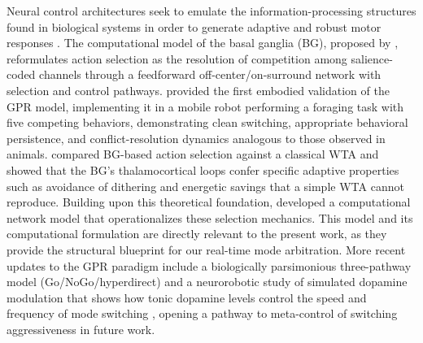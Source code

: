 Neural control architectures seek to emulate the information-processing structures found in biological systems in order to generate adaptive and robust motor responses \citep{mead1990neuromorphic,ijspeert2008}. The  computational model of the basal ganglia (BG), proposed by \citet{Gurney2001a,Gurney2001b}, reformulates action selection as the resolution of competition among salience-coded channels through a feedforward off-center/on-surround network with selection and control pathways. \citet{Prescott2006Robot} provided the first embodied validation of the GPR model, implementing it in a mobile robot performing a foraging task with five competing behaviors, demonstrating clean switching, appropriate behavioral persistence, and conflict-resolution dynamics analogous to those observed in animals. \citet{Girard2003Basal} compared BG-based action selection against a classical WTA and showed that the BG's thalamocortical loops confer specific adaptive properties such as avoidance of dithering and energetic savings that a simple WTA cannot reproduce. Building upon this theoretical foundation, \citet{sarvestani2013computational} developed a computational network model that operationalizes these selection mechanics. This model and its computational formulation are directly relevant to the present work, as they provide the structural blueprint for our real-time mode arbitration. More recent updates to the GPR paradigm include a biologically parsimonious three-pathway model (Go/NoGo/hyperdirect) \citep{Baston2015Biologically} and a neurorobotic study of simulated dopamine modulation that shows how tonic dopamine levels control the speed and frequency of mode switching \citep{Prescott2024Simulated}, opening a pathway to meta-control of switching aggressiveness in future work. 

